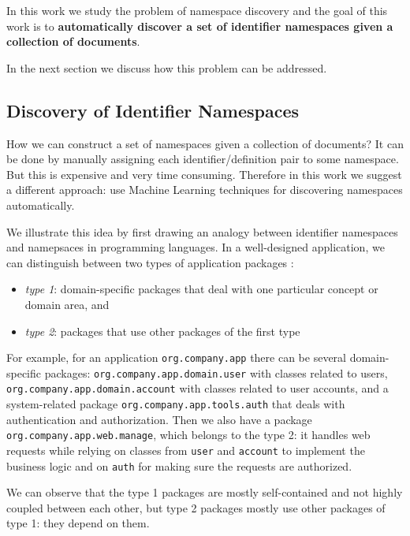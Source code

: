 In this work we study the problem of namespace discovery and the
goal of this work is to \textbf{automatically discover a set of identifier
namespaces given a collection of documents}.

In the next section we discuss how this problem can be addressed.


\subsection{Discovery of Identifier Namespaces}


How we can construct a set of namespaces given a collection of documents?
It can be done by manually assigning each identifier/definition pair
to some namespace. But this is expensive and very time consuming. Therefore
in this work we suggest a different approach: use Machine Learning
techniques for discovering namespaces automatically.


We illustrate this idea by first drawing an analogy between identifier
namespaces and namepsaces in programming languages.
In a well-designed application, we can distinguish between two types of
application packages \cite{evans2004domain}:

\begin{itemize}
  \item \emph{type 1}: domain-specific packages that deal with one particular
    concept or domain area, and
  \item \emph{type 2}: packages that use other packages of
    the first type
\end{itemize}

For example, for an application \verb|org.company.app|
there can be several domain-specific packages: \verb|org.company.app.domain.user|
with classes related to users, \verb|org.company.app.domain.account|
with classes related to user accounts, and a system-related package
\verb|org.company.app.tools.auth| that deals with authentication and
authorization. Then we also have a package \verb|org.company.app.web.manage|,
which belongs to the type 2: it handles web requests
while relying on classes from \verb|user| and \verb|account| to
implement the business logic and on \verb|auth| for making sure the
requests are authorized.

We can observe that the type 1 packages are mostly self-contained
and not highly coupled between each other, but type 2 packages mostly
use other packages of type 1: they depend on them.

